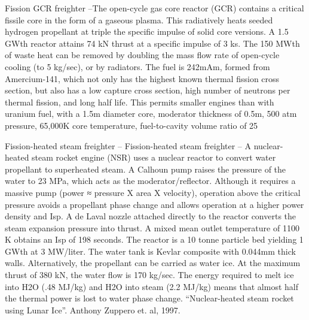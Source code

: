 \documentclass[a4paper]{book}
\begin{document}
Fission GCR freighter –The open-cycle gas core reactor (GCR) contains a critical fissile core in the form of a gaseous plasma. This radiatively heats seeded hydrogen propellant at triple the specific impulse of solid core versions. A 1.5 GWth reactor attains 74 kN thrust at a specific impulse of 3 ks. The 150 MWth of waste heat can be removed by doubling the mass flow rate of open-cycle cooling (to 5 kg/sec), or by radiators. The fuel is 242mAm, formed from Amercium-141, which not only has the highest known thermal fission cross section, but also has a low capture cross section, high number of neutrons per thermal fission, and long half life. This permits smaller engines than with uranium fuel, with a 1.5m diameter core, moderator thickness of 0.5m, 500 atm pressure, 65,000K core temperature, fuel-to-cavity volume ratio of 25%
 
Fission-heated steam freighter – Fission-heated steam freighter – A nuclear-heated steam rocket engine (NSR) uses a nuclear reactor to convert water propellant to superheated steam. A Calhoun pump raises the pressure of the water to 23 MPa, which acts as the moderator/reflector. Although it requires a massive pump (power ≈ pressure X area X velocity), operation above the critical pressure avoids a propellant phase change and allows operation at a higher power density and Isp. A de Laval nozzle attached directly to the reactor converts the steam expansion pressure into thrust. A mixed mean outlet temperature of 1100 K obtains an Isp of 198 seconds. The reactor is a 10 tonne particle bed yielding 1 GWth at 3 MW/liter. The water tank is Kevlar composite with 0.044mm thick walls. Alternatively, the propellant can be carried as water ice. At the maximum thrust of 380 kN, the water flow is 170 kg/sec. The energy required to melt ice into H2O (.48 MJ/kg) and H2O into steam (2.2 MJ/kg) means that almost half the thermal power is lost to water phase change. “Nuclear-heated steam rocket using Lunar Ice”. Anthony Zuppero et. al, 1997.
 
\end{document}
